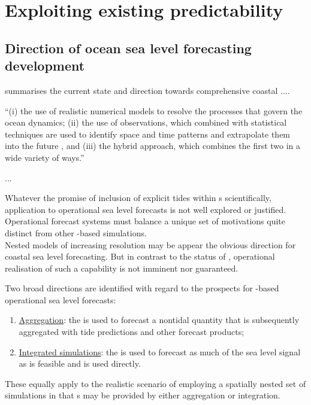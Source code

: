 \section{Exploiting existing predictability}
\label{S:fc_prospects}


\subsection{Direction of ocean sea level forecasting development}

\cite{10.3389/fmars.2019.00437} summarises the current state and direction towards comprehensive coastal ....

 ``(i) the use of realistic numerical models to resolve the processes that govern the ocean dynamics; (ii) the use of observations, which combined with statistical techniques are used to identify space and time patterns and extrapolate them into the future , and (iii) the hybrid approach, which combines the first two in a wide variety of ways.''
 
 ...

Whatever the promise of inclusion of explicit tides within \OGCM{}s scientifically, application to operational sea level forecasts is not well explored or justified.
Operational forecast systems must balance a unique set of motivations quite distinct from other \OGCM{}-based simulations.  \\
Nested models of increasing resolution may be appear the obvious direction for coastal sea level forecasting.  But in contrast to the status of \BL{}, operational realisation of such a capability is not imminent nor guaranteed.


Two broad directions are identified with regard to the prospects for \OGCM{}-based operational sea level forecasts:
\begin{enumerate}
\item \underline{Aggregation}: the \OGCM{} is used to forecast a nontidal quantity that is subsequently aggregated with tide predictions and other forecast products;
\item \underline{Integrated simulations}: the \OGCM{} is used to forecast as much of the sea level signal as is feasible and is used directly.
\end{enumerate}
These equally apply to the realistic scenario of employing a spatially nested set of simulations in that \obc{}s may be provided by either aggregation or integration.\\


